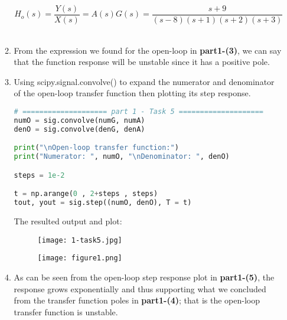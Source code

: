\documentclass[12pt,a4paper]{article}
\begin{document}
\begin{itemize}
\begin{enumerate}
    $$H_{o}(s) = \frac{Y(s)}{X(s)} = A(s)G(s) = \frac{s+9}{(s-8)(s+1)(s+2)(s+3)}$$\\

    \item 
    From the expression we found for the open-loop in \textbf{part1-(3)}, we can say that the function response will be unstable since it has a positive pole.

\clearpage
    
    \item
    Using scipy.signal.convolve() to expand the numerator and denominator of the open-loop transfer function then plotting its step response.\\
    
\begin{lstlisting}[language=Python, caption={open-loop step response using scipy.signal.convolve()}, label={lst:code}, mathescape=true, breaklines=true]
# ==================== part 1 - Task 5 ====================
numO = sig.convolve(numG, numA)
denO = sig.convolve(denG, denA)

print("\nOpen-loop transfer function:")
print("Numerator: ", numO, "\nDenominator: ", denO)

steps = 1e-2

t = np.arange(0 , 2+steps , steps)
tout, yout = sig.step((numO, denO), T = t)
\end{lstlisting}

The resulted output and plot:

\begin{figure}[h]
    \centering
    \texttt{[image: 1-task5.jpg]}
\end{figure}\textbf{}
    
\begin{figure}[h]
    \centering
    \texttt{[image: figure1.png]}
\end{figure}\textbf{}

    \item
    As can be seen from the open-loop step response plot in \textbf{part1-(5)}, the response grows exponentially and thus supporting what we concluded from the transfer function poles in \textbf{part1-(4)}; that is the open-loop transfer function is unstable. 
    
\end{enumerate}
\clearpage
    

\end{itemize}
\end{document}
